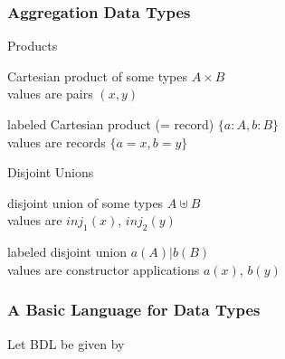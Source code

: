 \begin{frame}\frametitle{Aggregation Data Types}
\begin{blockitems}{Products}
 \item Cartesian product of some types $A\times B$ \\
 values are pairs $(x,y)$ 
 \item labeled Cartesian product (= record) $\{a: A, b: B\}$ \\
 values are records $\{a=x, b=y\}$
\end{blockitems}

\begin{blockitems}{Disjoint Unions}
 \item disjoint union of some types $A\uplus B$\\
  values are $inj_1(x)$, $inj_2(y)$
 \item labeled disjoint union $a(A)|b(B)$ \\
  values are constructor applications $a(x)$, $b(y)$
\end{blockitems}

\end{frame}

\begin{frame}\frametitle{A Basic Language for Data Types}
Let BDL be given by
\begin{commgrammar}
\\
\\
\\
\\
\\
\\
\\
\\
\\
\\
\\
\\
\\
\end{commgrammar}
\end{frame}


